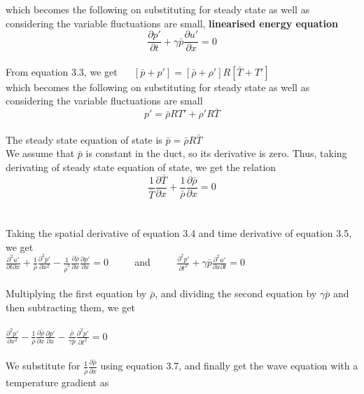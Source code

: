 \documentclass[8pt]{article} %
\begin{document}
which becomes the following on substituting for steady state as well as considering the variable fluctuations are small, \textbf{linearised energy equation}
\begin{equation}
\frac{\partial p'}{\partial t} + \gamma \bar{p} \frac{\partial u'}{\partial x} = 0
\end{equation}\\
From equation 3.3, we get $\quad$ $[\bar{p} + p'] = [\bar{\rho} + \rho'] R [\bar{T} + T']$\\
which becomes the following on substituting for steady state as well as considering the variable fluctuations are small 
\begin{equation}
p' = \bar{\rho} R T' + \rho' R \bar{T}
\end{equation}\\
The steady state equation of state is $\bar{p} = \bar{\rho} R \bar{T}$\\
We assume that $\bar{p}$ is constant in the duct, so its derivative is zero. Thus, taking derivating of steady state equation of state, we get the relation\\
\begin{equation}
\frac{1}{\bar{T}}\frac{\partial \bar{T}}{\partial x} + \frac{1}{\bar{\rho}}\frac{\partial \bar{\rho}}{\partial x} = 0
\end{equation}\\\\
Taking the spatial derivative of equation 3.4 and time derivative of equation 3.5, we get\\
$\frac{\partial^2 u'}{\partial t \partial x} + \frac{1}{\bar{\rho}} \frac{\partial^2 p'}{\partial x^2} - \frac{1}{\bar{\rho}^2} \frac{\partial \bar{\rho}}{\partial x} \frac{\partial p'}{\partial x} = 0$ $\quad\quad$ and $\quad\quad$  $\frac{\partial^2 p'}{\partial t^2} + \gamma \bar{p}  \frac{\partial^2 u'}{\partial x \partial t} = 0$\\\\
Multiplying the first equation by $\bar{\rho}$, and dividing the second equation by $\gamma \bar{p}$ and then subtracting them, we get\\\\
$\frac{\partial^2 p'}{\partial x^2} - \frac{1}{\bar{\rho}} \frac{\partial \bar{\rho}}{\partial x} \frac{\partial p'}{\partial x} - \frac{\bar{\rho}}{\gamma \bar{p} } \frac{\partial^2 p'}{\partial t^2} = 0$ \\\\
We substitute for $\frac{1}{ \bar{\rho}}\frac{\partial \bar{\rho}}{\partial x}$ using equation 3.7, and finally get the wave equation with a temperature gradient as
\end{document}

